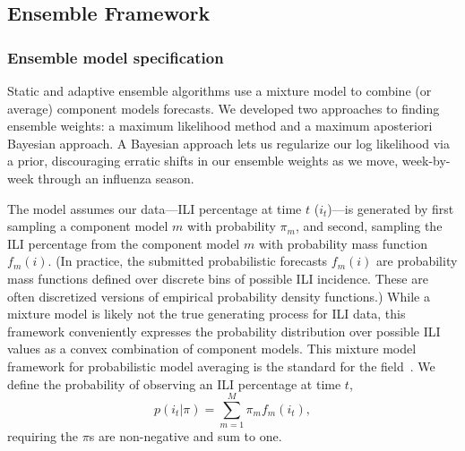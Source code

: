 \documentclass[12pt]{article}
\def\dx{\hspace{5mm}}
\begin{document}
\subsection{Ensemble Framework}
\subsubsection{Ensemble model specification}
Static and adaptive ensemble algorithms use a mixture model to combine (or average) component models forecasts. 
We developed two approaches to finding ensemble weights: a maximum likelihood method and a maximum aposteriori Bayesian approach. 
A Bayesian approach lets us regularize our log likelihood via a prior, discouraging erratic shifts in our ensemble weights as we move, week-by-week through an influenza season.

The model assumes our data---ILI percentage at time $t$ ($i_{t}$)---is generated by first sampling a component model $m$ with probability $\pi_m$, and second, sampling the ILI percentage from the component model $m$ with probability mass function $f_{m}(i)$. (In practice, the submitted probabilistic forecasts $f_{m}(i)$ are probability mass functions defined over discrete bins of possible ILI incidence. These are often discretized versions of empirical probability density functions.)
While a mixture model is likely not the true generating process for ILI data, this framework conveniently expresses the probability distribution over possible ILI values as a convex combination of component models.
This mixture model framework for probabilistic model averaging is the standard for the field~\cite{reich2019collaborative,ray2018prediction,brooks2018nonmechanistic}.
We define the probability of observing an ILI percentage at time $t$,
\begin{equation}
     p(i_{t}|\pi) = \sum_{m=1}^{M} \pi_m f_{m}(i_{t}),
\end{equation}
requiring the $\pi$s are non-negative and sum to one.
\end{document}
